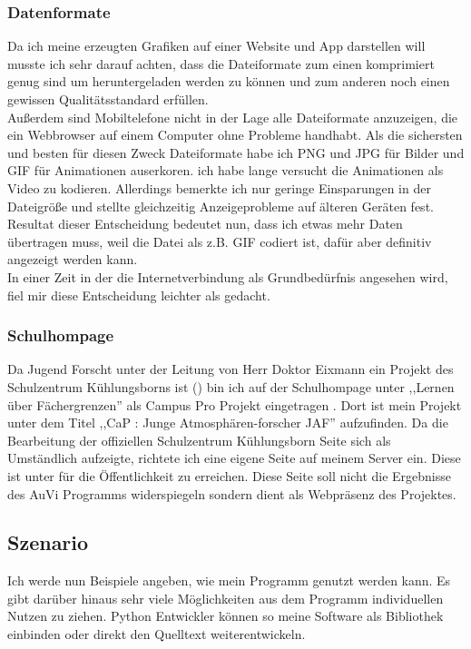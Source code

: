 \subsubsection{Datenformate} %
Da ich meine erzeugten Grafiken auf einer Website und App darstellen will
musste ich sehr darauf achten,
dass die Dateiformate zum einen komprimiert genug sind
um heruntergeladen werden zu können und zum anderen
noch einen gewissen Qualitätsstandard erfüllen.\\
Außerdem sind Mobiltelefone nicht in der Lage alle
Dateiformate anzuzeigen,
die ein Webbrowser auf einem Computer ohne Probleme handhabt.
Als die sichersten und besten für diesen Zweck Dateiformate habe
ich PNG und JPG für Bilder
und GIF für Animationen auserkoren.
ich habe lange versucht die Animationen als Video zu kodieren.
Allerdings bemerkte ich nur geringe Einsparungen in der
Dateigröße und stellte gleichzeitig Anzeigeprobleme auf
älteren Geräten fest.
Resultat dieser Entscheidung bedeutet nun, dass ich etwas mehr
Daten übertragen muss, weil die Datei als z.B. GIF codiert ist,
dafür aber definitiv angezeigt werden kann.\\
In einer Zeit in der die Internetverbindung als Grundbedürfnis
angesehen wird, fiel mir diese Entscheidung leichter als gedacht.

\subsubsection{Schulhompage} %
Da Jugend Forscht unter der Leitung von Herr Doktor Eixmann
ein Projekt des Schulzentrum Kühlungsborns ist
() bin ich auf der Schulhompage
unter ,,Lernen über Fächergrenzen'' als Campus Pro Projekt eingetragen \cite{szkb}.
Dort ist mein Projekt unter dem Titel ,,CaP \jf : Junge Atmosphären-forscher JAF'' aufzufinden.
Da die Bearbeitung der offiziellen Schulzentrum Kühlungsborn Seite sich als Umständlich aufzeigte,
richtete ich eine eigene Seite auf meinem Server ein.
Diese ist unter 
für die Öffentlichkeit zu erreichen.
Diese Seite soll nicht die Ergebnisse des AuVi Programms
widerspiegeln sondern dient als Webpräsenz des Projektes.

\subsection{Szenario} %
Ich werde nun Beispiele angeben, wie mein Programm genutzt werden kann.
Es gibt darüber hinaus sehr viele Möglichkeiten aus dem Programm individuellen Nutzen zu ziehen.
Python Entwickler können so meine Software als Bibliothek einbinden oder direkt den Quelltext
weiterentwickeln.

